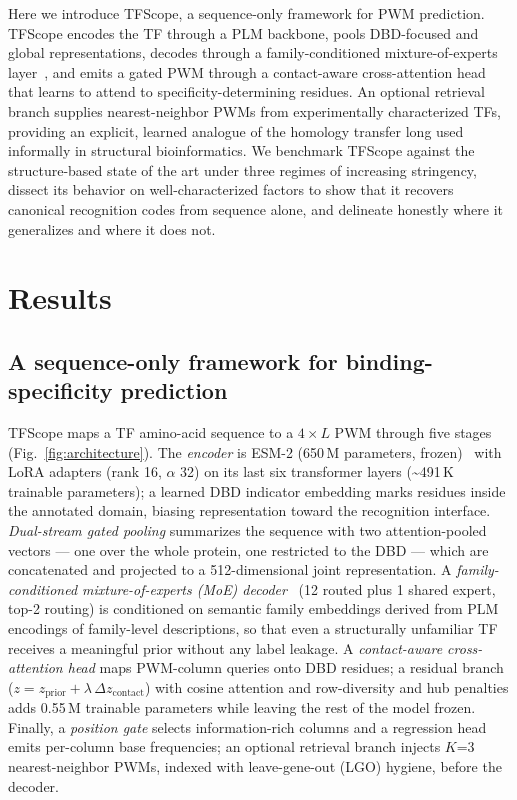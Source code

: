 \documentclass[11pt,letterpaper]{article}
\newcommand{\ts}{\textasciitilde}
\begin{document}
Here we introduce TFScope, a sequence-only framework for PWM prediction. TFScope
encodes the TF through a PLM backbone, pools DBD-focused and global
representations, decodes through a family-conditioned mixture-of-experts
layer~\cite{Dai2024}, and emits a gated PWM through a contact-aware cross-attention
head that learns to attend to specificity-determining residues. An optional
retrieval branch supplies nearest-neighbor PWMs from experimentally characterized
TFs, providing an explicit, learned analogue of the homology transfer long used
informally in structural bioinformatics. We benchmark TFScope against the
structure-based state of the art under three regimes of increasing stringency,
dissect its behavior on well-characterized factors to show that it recovers
canonical recognition codes from sequence alone, and delineate honestly where it
generalizes and where it does not.

\section*{Results}

\subsection*{A sequence-only framework for binding-specificity prediction}

TFScope maps a TF amino-acid sequence to a $4 \times L$ PWM through five stages
(Fig.~\ref{fig:architecture}). The \textit{encoder} is ESM-2 (650\,M parameters,
frozen)~\cite{Lin2023} with LoRA adapters (rank 16, $\alpha$ 32) on its last six
transformer layers (\ts491\,K trainable parameters); a learned DBD indicator
embedding marks residues inside the annotated domain, biasing representation
toward the recognition interface. \textit{Dual-stream gated pooling} summarizes the
sequence with two attention-pooled vectors — one over the whole protein, one
restricted to the DBD — which are concatenated and projected to a 512-dimensional
joint representation. A \textit{family-conditioned mixture-of-experts (MoE)
decoder}~\cite{Dai2024} (12 routed plus 1 shared expert, top-2 routing) is
conditioned on semantic family embeddings derived from PLM encodings of
family-level descriptions, so that even a structurally unfamiliar TF receives a
meaningful prior without any label leakage. A \textit{contact-aware cross-attention
head} maps PWM-column queries onto DBD residues; a residual branch
($z = z_{\mathrm{prior}} + \lambda\,\Delta z_{\mathrm{contact}}$) with cosine
attention and row-diversity and hub penalties adds 0.55\,M trainable parameters
while leaving the rest of the model frozen. Finally, a \textit{position gate}
selects information-rich columns and a regression head emits per-column base
frequencies; an optional retrieval branch injects $K$=3 nearest-neighbor PWMs,
indexed with leave-gene-out (LGO) hygiene, before the decoder.
\end{document}
